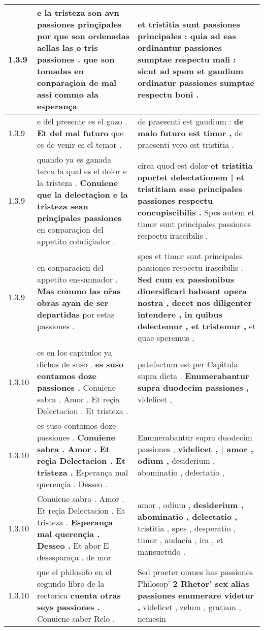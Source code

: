 \begin{tabular}{|p{1cm}|p{6.5cm}|p{6.5cm}|}
1.3.9 & e la tristeza son avn passiones prinçipales \textbf{ por que son ordenadas aellas las o tris passiones . que son tomadas en conparaçion de mal } assi commo ala esperança & et tristitia sunt passiones principales : \textbf{ quia ad eas ordinantur passiones sumptae respectu mali : } sicut ad spem et gaudium ordinatur passiones sumptae respectu boni . \\\hline
1.3.9 & e del presente es el gozo . \textbf{ Et del mal futuro } que es de venir es el temor . & de praesenti est gaudium : \textbf{ de malo futuro est timor , } de praesenti vero est tristitia . \\\hline
1.3.9 & quando ya es ganada terca la qual es el dolor e la tristeza . \textbf{ Conuiene que la delectaçion e la tristeza sean prinçipales passiones } en conparaçion del appetito cobdiçiador . & circa quod est dolor \textbf{ et tristitia oportet delectationem | et tristitiam esse principales passiones respectu concupiscibilis . } Spes autem et timor sunt principales passiones respectu irascibilis . \\\hline
1.3.9 & en conparacion del appetito enssannador . \textbf{ Mas commo las nr̃as obras ayan de ser departidas } por estas passiones . & spes et timor sunt principales passiones respectu irascibilis . \textbf{ Sed cum ex passionibus diuersificari habeant opera nostra , decet nos diligenter intendere , in quibus delectemur , et tristemur , } et quae speremus , \\\hline
1.3.10 & es en los capitulos ya dichos de suso . \textbf{ es suso contamos doze passiones . } Conuiene sabra . Amor . Et reçia Delectacion . Et tristeza . & patefactum est per Capitula supra dicta . \textbf{ Enumerabantur supra duodecim passiones , } videlicet , \\\hline
1.3.10 & es suso contamos doze passiones . \textbf{ Conuiene sabra . Amor . Et reçia Delectacion . Et tristeza . } Esperança mal querençia . Desseo . & Enumerabantur supra duodecim passiones , \textbf{ videlicet , | amor , odium , } desiderium , abominatio , delectatio , \\\hline
1.3.10 & Conuiene sabra . Amor . Et reçia Delectacion . Et tristeza . \textbf{ Esperança mal querençia . Desseo . } Et abor E desesparaça . de mor . & amor , odium , \textbf{ desiderium , abominatio , delectatio , } tristitia , spes , desperatio , timor , audacia , ira , et mansuetudo . \\\hline
1.3.10 & que el philosofo en el segundo libro de la rectorica \textbf{ cuenta otras seys passiones . } Conuiene saber Relo . & Sed praeter omnes has passiones Philosop’ \textbf{ 2 Rhetor’ sex alias passiones enumerare videtur , } videlicet , zelum , gratiam , nemesin \\\hline

\end{tabular}
